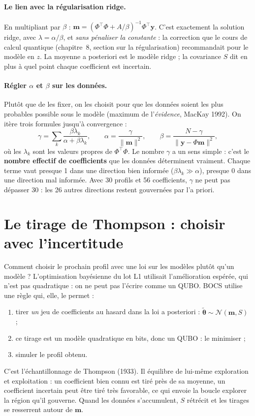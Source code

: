\paragraph{Le lien avec la régularisation ridge.} En multipliant par $\beta$ : $\mathbf m=(\Phi^\top\Phi+A/\beta)^{-1}\Phi^\top\mathbf y$. C'est exactement la solution ridge, avec $\lambda=\alpha/\beta$, et \emph{sans pénaliser la constante} : la correction que le cours de calcul quantique (chapitre~8, section sur la régularisation) recommandait pour le modèle en $z$. La moyenne a posteriori est le modèle ridge ; la covariance $S$ dit en plus à quel point chaque coefficient est incertain.

\paragraph{Régler $\alpha$ et $\beta$ sur les données.} Plutôt que de les fixer, on les choisit pour que les données soient les plus probables possible sous le modèle (maximum de l'\emph{évidence}, MacKay 1992). On itère trois formules jusqu'à convergence :
\[ \gamma=\sum_k\frac{\beta\lambda_k}{\alpha+\beta\lambda_k},\qquad\alpha=\frac{\gamma}{\|\mathbf m\|^2},\qquad\beta=\frac{N-\gamma}{\|\mathbf y-\Phi\mathbf m\|^2}, \]
où les $\lambda_k$ sont les valeurs propres de $\Phi^\top\Phi$. Le nombre $\gamma$ a un sens simple : c'est le \textbf{nombre effectif de coefficients} que les données déterminent vraiment. Chaque terme vaut presque 1 dans une direction bien informée ($\beta\lambda_k\gg\alpha$), presque 0 dans une direction mal informée. Avec 30 profils et 56 coefficients, $\gamma$ ne peut pas dépasser 30 : les 26 autres directions restent gouvernées par l'a priori.

\section{Le tirage de Thompson : choisir avec l'incertitude}
Comment choisir le prochain profil avec une loi sur les modèles plutôt qu'un modèle ? L'optimisation bayésienne du lot L1 utilisait l'amélioration espérée, qui n'est pas quadratique : on ne peut pas l'écrire comme un QUBO. BOCS utilise une règle qui, elle, le permet :
\begin{enumerate}
\item tirer \emph{un} jeu de coefficients au hasard dans la loi a posteriori : $\tilde{\boldsymbol\theta}\sim\mathcal N(\mathbf m,S)$ ;
\item ce tirage est un modèle quadratique en bits, donc un QUBO : le minimiser ;
\item simuler le profil obtenu.
\end{enumerate}
C'est l'échantillonnage de Thompson (1933). Il équilibre de lui-même exploration et exploitation : un coefficient bien connu est tiré près de sa moyenne, un coefficient incertain peut être tiré très favorable, ce qui envoie la boucle explorer la région qu'il gouverne. Quand les données s'accumulent, $S$ rétrécit et les tirages se resserrent autour de $\mathbf m$.

